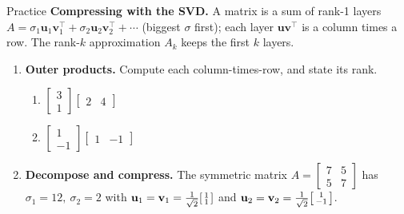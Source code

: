 \documentclass[10pt]{article}
\newcommand{\uu}{\mathbf{u}}
\newcommand{\vv}{\mathbf{v}}
\newcommand{\T}{^{\top}}
\begin{document}
\namedateperiod

\vspace{0.12in}

\begin{notesbox}{Practice}
\textbf{Compressing with the SVD.} A matrix is a sum of rank-1 layers
$A=\sigma_1\uu_1\vv_1\T+\sigma_2\uu_2\vv_2\T+\cdots$ (biggest $\sigma$ first); each layer $\uu\vv\T$ is a
column times a row. The rank-$k$ approximation $A_k$ keeps the first $k$ layers.

\begin{enumerate}[leftmargin=1.9em, itemsep=12pt]
  \item \textbf{Outer products.} Compute each column-times-row, and state its rank.
    \begin{enumerate}[label=(\alph*), leftmargin=1.8em, itemsep=3pt]
      \item $\begin{bmatrix} 3\\1 \end{bmatrix}\begin{bmatrix} 2 & 4 \end{bmatrix}$
      \item $\begin{bmatrix} 1\\-1 \end{bmatrix}\begin{bmatrix} 1 & -1 \end{bmatrix}$
    \end{enumerate}
  \item \textbf{Decompose and compress.} The symmetric matrix $A=\begin{bmatrix} 7 & 5\\ 5 & 7 \end{bmatrix}$
        has $\sigma_1=12,\ \sigma_2=2$ with $\uu_1=\vv_1=\tfrac1{\sqrt2}\begin{bsmallmatrix} 1\\1 \end{bsmallmatrix}$
        and $\uu_2=\vv_2=\tfrac1{\sqrt2}\begin{bsmallmatrix} 1\\-1 \end{bsmallmatrix}$.

\end{enumerate}
\end{notesbox}
\end{document}
